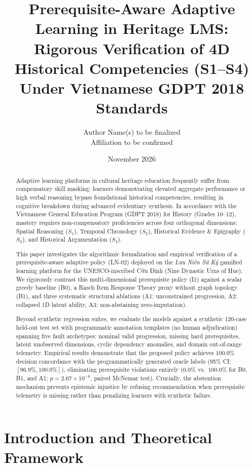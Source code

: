 \documentclass[11pt,a4paper]{article}
\title{\textbf{Prerequisite-Aware Adaptive Learning in Heritage LMS:}\\
\large Rigorous Verification of 4D Historical Competencies (S1--S4) Under Vietnamese GDPT 2018 Standards}
\author{
  Author Name(s) to be finalized \\
  \small Affiliation to be confirmed
}
\date{November 2026}
\begin{document}
\maketitle

\begin{abstract}
Adaptive learning platforms in cultural heritage education frequently suffer from compensatory skill masking: learners demonstrating elevated aggregate performance or high verbal reasoning bypass foundational historical competencies, resulting in cognitive breakdown during advanced evidentiary synthesis. In accordance with the Vietnamese General Education Program (GDPT 2018) for History (Grades 10--12), mastery requires non-compensatory proficiencies across four orthogonal dimensions: Spatial Reasoning ($S_1$), Temporal Chronology ($S_2$), Historical Evidence \& Epigraphy ($S_3$), and Historical Argumentation ($S_4$). 

This paper investigates the algorithmic formalization and empirical verification of a prerequisite-aware adaptive policy (LN-02) deployed on the \textit{Lưu Niên Sứ Ký} gamified learning platform for the UNESCO-inscribed Cửu Đỉnh (Nine Dynastic Urns of Hue). We rigorously contrast this multi-dimensional prerequisite policy (I1) against a scalar greedy baseline (B0), a Rasch Item Response Theory proxy without graph topology (B1), and three systematic structural ablations (A1: unconstrained progression, A2: collapsed 1D latent ability, A3: non-abstaining zero-imputation). 

Beyond synthetic regression suites, we evaluate the models against a synthetic 120-case held-out test set with programmatic annotation templates (no human adjudication) spanning five fault archetypes: nominal valid progression, missing hard prerequisites, latent unobserved dimensions, cyclic dependency anomalies, and domain out-of-range telemetry. Empirical results demonstrate that the proposed policy achieves $100.0\%$ decision concordance with the programmatically generated oracle labels (95\% CI: $[96.9\%, 100.0\%]$), eliminating prerequisite violations entirely ($0.0\%$ vs.\ $100.0\%$ for B0, B1, and A1; $p = 2.67 \times 10^{-6}$, paired McNemar test). Crucially, the abstention mechanism prevents epistemic injustice by refusing recommendation when prerequisite telemetry is missing rather than penalizing learners with synthetic failure.
\end{abstract}

\section{Introduction and Theoretical Framework}
\end{document}
